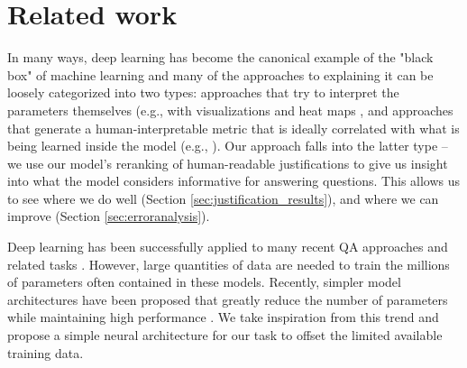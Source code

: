 \section{Related work}

In many ways, deep learning has become the canonical example of the "black box" of machine learning and many of the approaches to explaining it can be loosely categorized into two types: approaches that try to interpret the parameters themselves (e.g., with visualizations and heat maps \citep{Zeiler2014VisualizingAU,nips15_hermann, Li2016VisualizingAU}, and approaches that generate a human-interpretable metric that is ideally correlated with what is being learned inside the model (e.g., \citet{Lei2016RationalizingNP}). Our approach falls into the latter type -- 
we use our model's reranking of human-readable justifications to give us insight into what the model considers informative for answering questions.  This allows us to see where we do well (Section \ref{sec:justification_results}), and where we can improve (Section  \ref{sec:erroranalysis}).

Deep learning has been successfully applied to many recent QA approaches and related tasks \cite[][inter alia]{Bordes2015LargescaleSQ,nips15_hermann, He2016CharacterLevelQA, dong2015question, Tan2016ImprovedRL}.
However, large quantities of data are needed to train the millions of parameters often contained in these models.  
Recently, simpler model architectures have been proposed that greatly reduce the number of parameters while maintaining high performance \cite[e.g.,][]{Iyyer2015,chen2016thorough,Parikh2016ADA}.  
We take inspiration from this trend and propose a simple neural architecture for our task to offset the limited available training data. 

